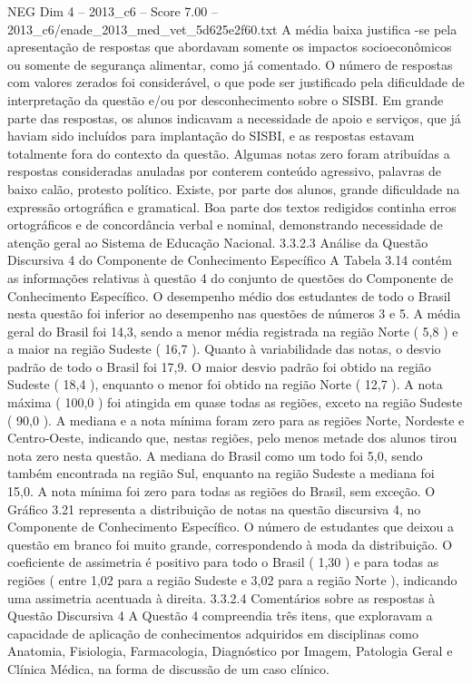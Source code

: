 \begin{textsample}{NEG Dim 4 – 2013\_c6 – Score 7.00 – 2013\_c6/enade\_2013\_med\_vet\_5d625e2f60.txt}
A média baixa justifica -se pela apresentação de respostas que abordavam somente os impactos socioeconômicos ou somente de segurança alimentar, como já comentado.
O número de respostas com valores zerados foi considerável, o que pode ser justificado pela dificuldade de interpretação da questão e/ou por desconhecimento sobre o SISBI.
Em grande parte das respostas, os alunos indicavam a necessidade de apoio e serviços, que já haviam sido incluídos para implantação do SISBI, e as respostas estavam totalmente fora do contexto da questão.
Algumas notas zero foram atribuídas a respostas consideradas anuladas por conterem conteúdo agressivo, palavras de baixo calão, protesto político.
Existe, por parte dos alunos, grande dificuldade na expressão ortográfica e gramatical.
Boa parte dos textos redigidos continha erros ortográficos e de concordância verbal e nominal, demonstrando necessidade de atenção geral ao Sistema de Educação Nacional. 3.3.2.3 Análise da Questão Discursiva 4 do Componente de Conhecimento Específico A Tabela 3.14 contém as informações relativas à questão 4 do conjunto de questões do Componente de Conhecimento Específico.
O desempenho médio dos estudantes de todo o Brasil nesta questão foi inferior ao desempenho nas questões de números 3 e 5.
A média geral do Brasil foi 14,3, sendo a menor média registrada na região Norte ( 5,8 ) e a maior na região Sudeste ( 16,7 ).
Quanto à variabilidade das notas, o desvio padrão de todo o Brasil foi 17,9.
O maior desvio padrão foi obtido na região Sudeste ( 18,4 ), enquanto o menor foi obtido na região Norte ( 12,7 ).
A nota máxima ( 100,0 ) foi atingida em quase todas as regiões, exceto na região Sudeste ( 90,0 ).
A mediana e a nota mínima foram zero para as regiões Norte, Nordeste e Centro-Oeste, indicando que, nestas regiões, pelo menos metade dos alunos tirou nota zero nesta questão.
A mediana do Brasil como um todo foi 5,0, sendo também encontrada na região Sul, enquanto na região Sudeste a mediana foi 15,0.
A nota mínima foi zero para todas as regiões do Brasil, sem exceção.
O Gráfico 3.21 representa a distribuição de notas na questão discursiva 4, no Componente de Conhecimento Específico.
O número de estudantes que deixou a questão em branco foi muito grande, correspondendo à moda da distribuição.
O coeficiente de assimetria é positivo para todo o Brasil ( 1,30 ) e para todas as regiões ( entre 1,02 para a região Sudeste e 3,02 para a região Norte ), indicando uma assimetria acentuada à direita. 3.3.2.4 Comentários sobre as respostas à Questão Discursiva 4 A Questão 4 compreendia três itens, que exploravam a capacidade de aplicação de conhecimentos adquiridos em disciplinas como Anatomia, Fisiologia, Farmacologia, Diagnóstico por Imagem, Patologia Geral e Clínica Médica, na forma de discussão de um caso clínico.

\end{textsample}
